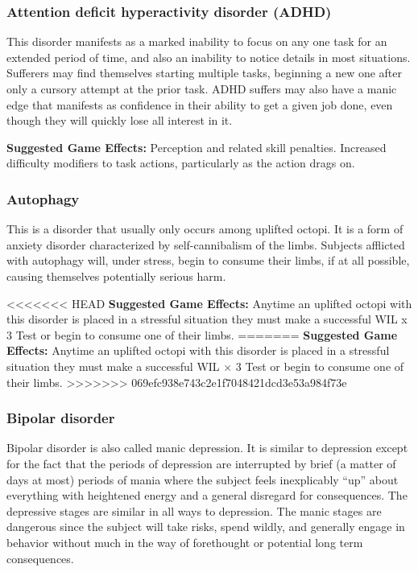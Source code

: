 \subsubsection{Attention deficit hyperactivity disorder (ADHD)}

This disorder manifests as a marked inability to focus on any one task for an extended period of time, and also an inability to notice details in most situations. Sufferers may find themselves starting multiple tasks, beginning a new one after only a cursory attempt at the prior task. ADHD suffers may also have a manic edge that manifests as confidence in their ability to get a given job done, even though they will quickly lose all interest in it.

\textbf{Suggested Game Effects:} Perception and related skill penalties. Increased difficulty modifiers to task actions, particularly as the action drags on.

\subsubsection{Autophagy}

This is a disorder that usually only occurs among uplifted octopi. It is a form of anxiety disorder characterized by self-cannibalism of the limbs. Subjects afflicted with autophagy will, under stress, begin to consume their limbs, if at all possible, causing themselves potentially serious harm.

<<<<<<< HEAD
\textbf{Suggested Game Effects:} Anytime an uplifted octopi with this disorder is placed in a stressful situation they must make a successful WIL x 3 Test or begin to consume one of their limbs.
=======
\textbf{Suggested Game Effects:} Anytime an uplifted octopi with this disorder is placed in a stressful situation they must make a successful WIL $\times$ 3 Test or begin to consume one of their limbs.
>>>>>>> 069efc938e743c2e1f7048421dcd3e53a984f73e

\subsubsection{Bipolar disorder}

Bipolar disorder is also called manic depression. It is similar to depression except for the fact that the periods of depression are interrupted by brief (a matter of days at most) periods of mania where the subject feels inexplicably ``up” about everything with heightened energy and a general disregard for consequences. The depressive stages are similar in all ways to depression. The manic stages are dangerous since the subject will take risks, spend wildly, and generally engage in behavior without much in the way of forethought or potential long term consequences.

